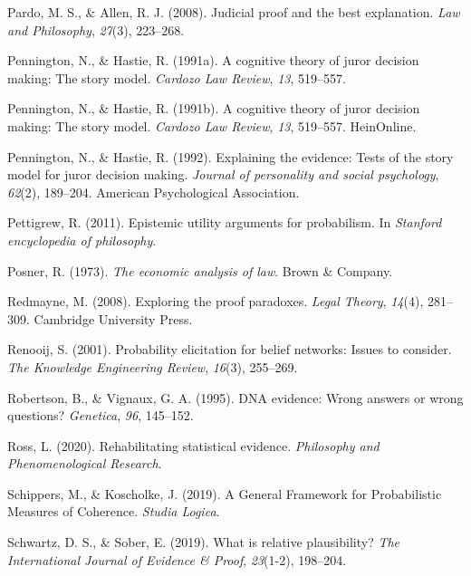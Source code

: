 \documentclass[11pt,dvipsnames,enabledeprecatedfontcommands]{scrartcl}
\begin{document}
\hypertarget{ref-Pardo2008judicial}{}
Pardo, M. S., \& Allen, R. J. (2008). Judicial proof and the best
explanation. \emph{Law and Philosophy}, \emph{27}(3), 223--268.

\hypertarget{ref-Pennington1991}{}
Pennington, N., \& Hastie, R. (1991a). A cognitive theory of juror
decision making: The story model. \emph{Cardozo Law Review}, \emph{13},
519--557.

\hypertarget{ref-pennington1991cognitive}{}
Pennington, N., \& Hastie, R. (1991b). A cognitive theory of juror
decision making: The story model. \emph{Cardozo Law Review}, \emph{13},
519--557. HeinOnline.

\hypertarget{ref-pennington1992explaining}{}
Pennington, N., \& Hastie, R. (1992). Explaining the evidence: Tests of
the story model for juror decision making. \emph{Journal of personality
and social psychology}, \emph{62}(2), 189--204. American Psychological
Association.

\hypertarget{ref-Pettigrew2011Epistemic-Utili}{}
Pettigrew, R. (2011). Epistemic utility arguments for probabilism. In
\emph{Stanford encyclopedia of philosophy}.

\hypertarget{ref-Posner1973}{}
Posner, R. (1973). \emph{The economic analysis of law}. Brown \&
Company.

\hypertarget{ref-redmayne2008exploring}{}
Redmayne, M. (2008). Exploring the proof paradoxes. \emph{Legal Theory},
\emph{14}(4), 281--309. Cambridge University Press.

\hypertarget{ref-renooij2001ProbabilityElicitationBeliefa}{}
Renooij, S. (2001). Probability elicitation for belief networks: Issues
to consider. \emph{The Knowledge Engineering Review}, \emph{16}(3),
255--269.

\hypertarget{ref-Robertson1995evidence}{}
Robertson, B., \& Vignaux, G. A. (1995). DNA evidence: Wrong answers or
wrong questions? \emph{Genetica}, \emph{96}, 145--152.

\hypertarget{ref-ross2020}{}
Ross, L. (2020). Rehabilitating statistical evidence. \emph{Philosophy
and Phenomenological Research}.

\hypertarget{ref-Schippers2019General}{}
Schippers, M., \& Koscholke, J. (2019). A General Framework for
Probabilistic Measures of Coherence. \emph{Studia Logica}.

\hypertarget{ref-schwartz2019WhatRelativePlausibility}{}
Schwartz, D. S., \& Sober, E. (2019). What is relative plausibility?
\emph{The International Journal of Evidence \& Proof}, \emph{23}(1-2),
198--204.
\end{document}
